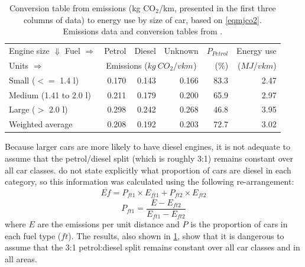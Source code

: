 \begin{table}[htbp]
\caption[Conversion table from emissions to energy use by size of car]
{Conversion table from emissions (kg CO$_2$/km,
presented in the first three columns of data) to energy use by size of car,
based on \cref{eqmjco2}.
Emissions data and conversion tables from \citet{Defra2011}.}
\begin{center}
\begin{tabular}{llrrrrr}
\toprule
\multicolumn{ 2}{l}{Engine size $\Downarrow$ Fuel $\Rightarrow$} & \multicolumn{1}{l}{Petrol} & \multicolumn{1}{l}{Diesel} & \multicolumn{1}{l}{Unknown} & \multicolumn{1}{l}{$P_{Petrol}$} & \multicolumn{1}{l}{Energy use} \\
Units $\Rightarrow$  & &\multicolumn{3}{c}{Emissions (${kg ~CO_{2}}/{vkm}_{}$)} & (\%) & ($MJ/vkm$) \\
\midrule
\multicolumn{ 2}{l}{Small ($<=$ 1.4 l)} & 0.170 & 0.143 & 0.166 & 83.3 & 2.47 \\
\multicolumn{ 2}{l}{Medium (1.41 to 2.0 l)} & 0.211 & 0.179 & 0.200 & 65.9 & 2.97 \\
\multicolumn{ 2}{l}{Large ($>$ 2.0 l)} & 0.298 & 0.242 & 0.268 & 46.8 & 3.95 \\
\multicolumn{ 2}{l}{Weighted average} & 0.208 & 0.192 & 0.203 & 72.7 & 3.02 \\
\bottomrule
\end{tabular}\end{center}
\label{tdefracar}
\end{table}

Because larger cars are more likely to have diesel engines, it is not adequate
to assume that the petrol/diesel split (which is roughly 3:1)
remains constant over all car classes. \citet{Defra2011} do not state
explicitly what proportion of cars are diesel in each category, so this
information was calculated using the following re-arrangement:
\begin{equation}
 \overline{Ef} = P_{ft1} \times E_{ft1} + P_{ft2} \times E_{ft2}
\end{equation}
\begin{equation}
  P_{ft1} = \frac{\overline{E} - E_{ft2}}{E_{ft1} - E_{ft2}}
\end{equation}
where $E$ are the emissions per unit distance and $P$ is the proportion of cars
in each fuel type ($ft$). The results, also shown in \cref{tdefracar}, show that
it is dangerous to assume that the 3:1 petrol:diesel split remains constant over
all car classes and in all areas.


